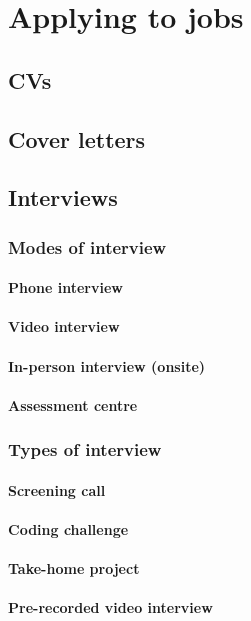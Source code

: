 \chapter{Applying to jobs}
\section{CVs}
\section{Cover letters}
\section{Interviews}
\subsection{Modes of interview}
\subsubsection{Phone interview}
\subsubsection{Video interview}
\subsubsection{In-person interview (onsite)}
\subsubsection{Assessment centre}
\subsection{Types of interview}
\subsubsection{Screening call}
\subsubsection{Coding challenge}
\subsubsection{Take-home project}
\subsubsection{Pre-recorded video interview}
